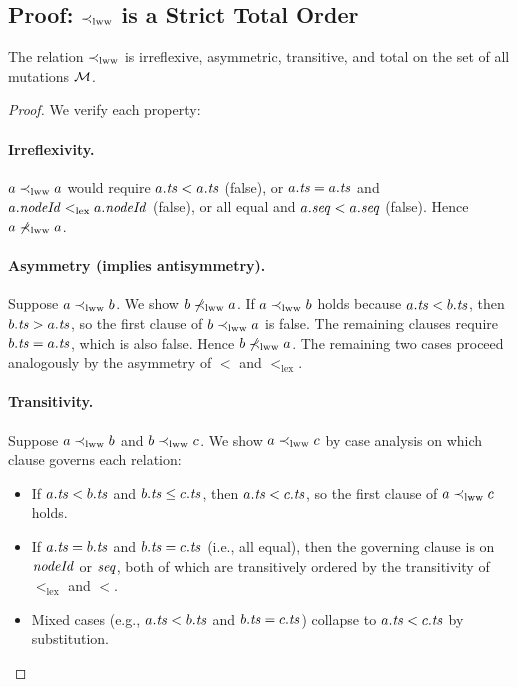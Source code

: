 \subsection{Proof: $\prec_{\mathrm{lww}}$ is a Strict Total Order}

\begin{theorem}
\label{thm:total-order}
The relation $\prec_{\mathrm{lww}}$ is irreflexive, asymmetric, transitive, and total on
the set of all mutations $\mathcal{M}$.
\end{theorem}

\begin{proof}
We verify each property:

\paragraph{Irreflexivity.}
$a \prec_{\mathrm{lww}} a$ would require $a.\mathit{ts} < a.\mathit{ts}$ (false), or $a.\mathit{ts} = a.\mathit{ts}$ and
$a.\mathit{nodeId} <_{\mathrm{lex}} a.\mathit{nodeId}$ (false), or all equal and $a.\mathit{seq} < a.\mathit{seq}$
(false). Hence $a \not\prec_{\mathrm{lww}} a$. \checkmark

\paragraph{Asymmetry (implies antisymmetry).}
Suppose $a \prec_{\mathrm{lww}} b$. We show $b \not\prec_{\mathrm{lww}} a$.
If $a \prec_{\mathrm{lww}} b$ holds because $a.\mathit{ts} < b.\mathit{ts}$, then $b.\mathit{ts} > a.\mathit{ts}$,
so the first clause of $b \prec_{\mathrm{lww}} a$ is false. The remaining clauses require
$b.\mathit{ts} = a.\mathit{ts}$, which is also false. Hence $b \not\prec_{\mathrm{lww}} a$.
The remaining two cases proceed analogously by the asymmetry of $<$ and
$<_{\mathrm{lex}}$. \checkmark

\paragraph{Transitivity.}
Suppose $a \prec_{\mathrm{lww}} b$ and $b \prec_{\mathrm{lww}} c$. We show $a \prec_{\mathrm{lww}} c$ by case analysis
on which clause governs each relation:
\begin{itemize}[leftmargin=1.5em]
  \item If $a.\mathit{ts} < b.\mathit{ts}$ and $b.\mathit{ts} \leq c.\mathit{ts}$, then $a.\mathit{ts} < c.\mathit{ts}$,
        so the first clause of $a \prec_{\mathrm{lww}} c$ holds.
  \item If $a.\mathit{ts} = b.\mathit{ts}$ and $b.\mathit{ts} = c.\mathit{ts}$ (i.e., all equal), then
        the governing clause is on $\mathit{nodeId}$ or $\mathit{seq}$, both of which are
        transitively ordered by the transitivity of $<_{\mathrm{lex}}$ and $<$.
  \item Mixed cases (e.g., $a.\mathit{ts} < b.\mathit{ts}$ and $b.\mathit{ts} = c.\mathit{ts}$) collapse
        to $a.\mathit{ts} < c.\mathit{ts}$ by substitution. \checkmark
\end{itemize}


\end{proof}
